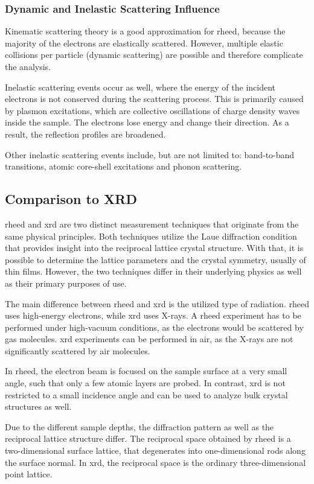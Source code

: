 \subsubsection{Dynamic and Inelastic Scattering Influence}
Kinematic scattering theory is a good approximation for \ac{rheed}, 
because the majority of the electrons are elastically scattered.
However, multiple elastic collisions per particle (dynamic scattering) are possible and
therefore complicate the analysis. 

Inelastic scattering events occur as well, where the energy of the incident electrons 
is not conserved during the scattering process.
This is primarily caused by plasmon excitations, which are collective oscillations of
charge density waves inside the sample.
The electrons lose energy and change their direction.
As a result, the reflection profiles are broadened. 

Other inelastic scattering events include, but are not limited to: band-to-band 
transitions, atomic core-shell excitations and phonon scattering.

\subsection{Comparison to XRD}
\ac{rheed} and \ac{xrd} are two distinct measurement techniques that originate from
the same physical principles. 
Both techniques utilize the Laue diffraction condition that provides insight into 
the reciprocal lattice crystal structure. 
With that, it is possible to determine the lattice parameters and the crystal symmetry,
usually of thin films.
However, the two techniques differ in their underlying physics as well as their primary 
purposes of use.

The main difference between \ac{rheed} and \ac{xrd} is the utilized type of radiation.
\ac{rheed} uses high-energy electrons, while \ac{xrd} uses X-rays.
A \ac{rheed} experiment has to be performed under high-vacuum conditions, as the 
electrons would be scattered by gas molecules.
\ac{xrd} experiments can be performed in air, as the X-rays are not significantly
scattered by air molecules.

In \ac{rheed}, the electron beam is focused on the sample surface at a very small angle,
such that only a few atomic layers are probed.
In contrast, \ac{xrd} is not restricted to a small incidence angle and can be used to
analyze bulk crystal structures as well.

Due to the different sample depths, the diffraction pattern as well as the reciprocal
lattice structure differ.
The reciprocal space obtained by \ac{rheed} is a two-dimensional surface lattice, that
degenerates into one-dimensional rods along the surface normal.
In \ac{xrd}, the reciprocal space is the ordinary three-dimensional point lattice.

